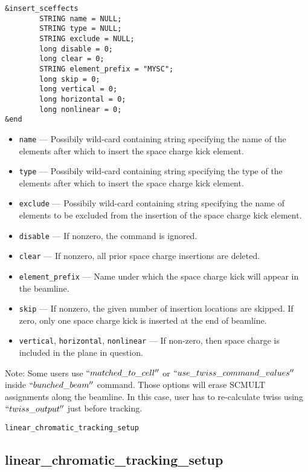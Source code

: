 \documentclass[11pt]{article}
\begin{document}
\begin{verbatim}
&insert_sceffects
        STRING name = NULL;
        STRING type = NULL;
        STRING exclude = NULL;
        long disable = 0;
        long clear = 0;
        STRING element_prefix = "MYSC";
        long skip = 0;
        long vertical = 0;
        long horizontal = 0;
        long nonlinear = 0;
&end
\end{verbatim}

\begin{itemize}
\item \verb|name| --- Possibily wild-card containing string specifying the
	name of the elements after which to insert the space charge kick element.
\item \verb|type| --- Possibily wild-card containing string specifying the
        type of the elements after which to insert the space charge kick element.
\item \verb|exclude| --- Possibily wild-card containing string specifying 
	the name of elements to be excluded from the insertion of the space charge kick element.
\item \verb|disable| --- If nonzero, the command is ignored.
\item \verb|clear| --- If nonzero, all prior space charge insertions are deleted.
\item \verb|element_prefix| --- Name under which the space charge kick will appear in the beamline.
\item \verb|skip| --- If nonzero, the given number of insertion locations are skipped. 
        If zero, only one space charge kick is inserted at the end of beamline. 
\item \verb|vertical|, \verb|horizontal|, \verb|nonlinear| --- If non-zero, then space charge is
included in the plane in question.
\end{itemize}

Note: Some users use $``matched\_to\_cell''$ or
$``use\_twiss\_command\_values''$ inside $``bunched\_beam''$
command. Those options will erase SCMULT assignments along the
beamline. In this case, user has to re-calculate twiss using
$``twiss\_output''$ just before tracking.

\begin{latexonly}
\newpage
\begin{center}{\Large\verb|linear_chromatic_tracking_setup|}\end{center}
\end{latexonly}
\subsection{linear\_chromatic\_tracking\_setup \label{subsec:linearchromatictrackingsetup}}
\end{document}
